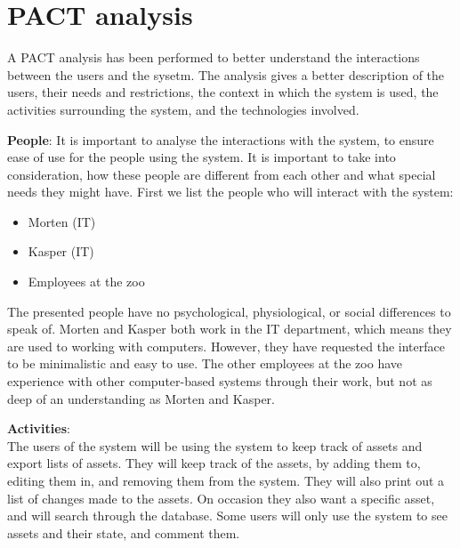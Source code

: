 \section{PACT analysis}\label{sc:PACT}
A PACT analysis has been performed to better understand the interactions between the users and the sysetm. The analysis gives a better description of the users, their needs and restrictions, the context in which the system is used, the activities surrounding the system, and the technologies involved.

\textbf{People}:
It is important to analyse the interactions with the system, to ensure ease of use for the people using the system. It is important to take into consideration, how these people are different from each other and what special needs they might have. First we list the people who will interact with the system:

\begin{itemize}
    \setlength\itemsep{0.05em}
    \item Morten (IT)
    \item Kasper (IT)
    \item Employees at the zoo
\end{itemize}

The presented people have no psychological, physiological, or social differences to speak of. Morten and Kasper both work in the IT department, which means they are used to working with computers. However, they have requested the interface to be minimalistic and easy to use. The other employees at the zoo have experience with other computer-based systems through their work, but not as deep of an understanding as Morten and Kasper.
\par

\textbf{Activities}: \\
The users of the system will be using the system to keep track of assets and export lists of assets. They will keep track of the assets, by adding them to, editing them in, and removing them from the system. They will also print out a list of changes made to the assets. On occasion they also want a specific asset, and will search through the database. Some users will only use the system to see assets and their state, and comment them.
\par

